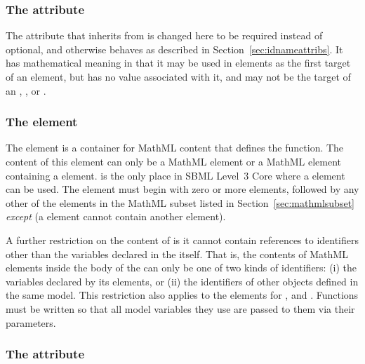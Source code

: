 \begin{blockChanged}
\subsubsection{The  attribute}

The  attribute that \FunctionDefinition inherits from \SBase is changed here to be required instead of optional, and otherwise behaves as described in Section~\ref{sec:idnameattribs}.  It has mathematical meaning in that it may be used in  elements as the first target of an  element, but has no value associated with it, and may not be the target of an \InitialAssignment, \EventAssignment, or \Rule.
\end{blockChanged}

\subsubsection{The  element}
\label{sec:function-definition-math}

The  element is a container for MathML content that
defines the function.  The content of this element can only be a
MathML  element or a MathML 
element containing a  element.  \FunctionDefinition
is the only place in SBML Level~3 Core where a 
element can be used.  The  element must begin with
zero or more  elements, followed by any other of the
elements in the MathML subset listed in
Section~\ref{sec:mathmlsubset} \emph{except}  (\ie a
 element cannot contain another 
element).

A further restriction on the content of  is it cannot
contain references to identifiers other than the
variables declared in the  itself.  That
is, the contents of MathML  elements inside the body of
the  can only be one of two kinds of
  identifiers: (i) the variables declared by its 
  elements, or (ii) the identifiers of other
\FunctionDefinition{} objects defined in the same model.  This
restriction also applies to the  elements for
,  and .
Functions must be written so that all model variables they use are
passed to them via their parameters.


\subsubsection{The  attribute}
\label{sec:functiondefinition-sboterm}

